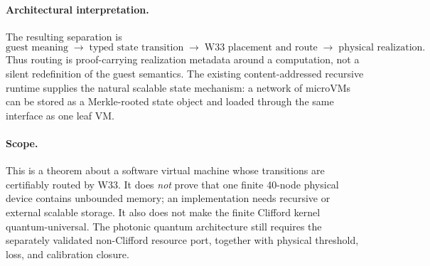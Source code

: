 \paragraph{Architectural interpretation.}
The resulting separation is
\[
 \text{guest meaning}
 \;\longrightarrow\;
 \text{typed state transition}
 \;\longrightarrow\;
 \text{W33 placement and route}
 \;\longrightarrow\;
 \text{physical realization}.
\]
Thus routing is proof-carrying realization metadata around a computation, not
a silent redefinition of the guest semantics. The existing content-addressed
recursive runtime supplies the natural scalable state mechanism: a network of
microVMs can be stored as a Merkle-rooted state object and loaded through the
same interface as one leaf VM.

\paragraph{Scope.}
This is a theorem about a software virtual machine whose transitions are
certifiably routed by W33. It does \emph{not} prove that one finite 40-node
physical device contains unbounded memory; an implementation needs recursive or
external scalable storage. It also does not make the finite Clifford kernel
quantum-universal. The photonic quantum architecture still requires the
separately validated non-Clifford resource port, together with physical
threshold, loss, and calibration closure.
